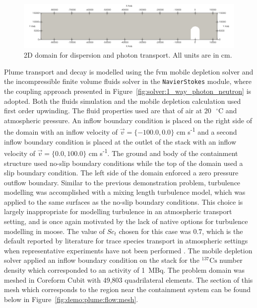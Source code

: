\begin{figure}[H]
    \centering
    \includegraphics[width=\textwidth]{images/demos/plume/domain.png}
    \caption{2D domain for dispersion and photon transport. All units are in cm.}
    \label{fig:demo:plume:geo:full}
\end{figure}

Plume transport and decay is modelled using the \acrshort{fvm} mobile depletion solver and the incompressible finite volume fluids solver in the \texttt{NavierStokes} module, where the coupling approach presented in Figure~\ref{fig:solver:1_way_photon_neutron} is adopted. Both the fluids simulation and the mobile depletion calculation used first order upwinding. The fluid properties used are that of air at $20\text{ }^{\circ}\text{C}$ and atmospheric pressure. An inflow boundary condition is placed on the right side of the domain with an inflow velocity of $\vec{v} = \{-100.0, 0.0\}$ cm s\textsuperscript{-1} and a second inflow boundary condition is placed at the outlet of the stack with an inflow velocity of $\vec{v} = \{0.0, 100.0\}$ cm s\textsuperscript{-1}. The ground and body of the containment structure used no-slip boundary conditions while the top of the domain used a slip boundary condition. The left side of the domain enforced a zero pressure outflow boundary. Similar to the previous demonstration problem, turbulence modelling was accomplished with a mixing length turbulence model, which was applied to the same surfaces as the no-slip boundary conditions. This choice is largely inappropriate for modelling turbulence in an atmospheric transport setting, and is once again motivated by the lack of native options for turbulence modelling in \acrshort{moose}. The value of $Sc_{t}$ chosen for this case was $0.7$, which is the default reported by literature for trace species transport in atmospheric settings when representative experiments have not been performed \cite{turbulent_schmidt_numbers}. The mobile depletion solver applied an inflow boundary condition on the stack for the $\mathrm{^{137}Cs}$ number density which corresponded to an activity of 1~MBq. The problem domain was meshed in Coreform Cubit with 49,803 quadrilateral elements. The section of this mesh which corresponds to the region near the containment system can be found below in Figure~\ref{fig:demo:plume:flow:mesh}.
